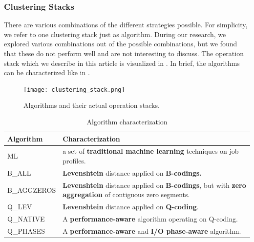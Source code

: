 \documentclass{jhps}
\begin{document}
\subsubsection{Clustering Stacks}
There are various combinations of the different strategies possible.
For simplicity, we refer to one clustering stack just as algorithm.
During our research, we explored various combinations out of the possible combinations, but we found that these do not perform well and are not interesting to discuss.
The operation stack which we describe in this article is visualized in .
In brief, the algorithms can be characterized like in .

\begin{figure}[ht]
  \centering
  \texttt{[image: clustering\_stack.png]}
  \caption{Algorithms and their actual operation stacks.}
  \label{fig:clustering_stacks}
\end{figure}


\begin{table}[ht]
  \begin{tabularx}{\textwidth}{lX}
    Algorithm & Characterization \\
    \midrule
    ML            & a set of \textbf{traditional machine learning} techniques on job profiles.                                                        \\
    B\_ALL      & \textbf{Levenshtein} distance applied on \textbf{B-codings.}                                                                 \\
    B\_AGGZEROS & \textbf{Levenshtein} distance applied on \textbf{B-codings}, but with \textbf{zero aggregation} of contiguous zero segments. \\
    Q\_LEV      & \textbf{Levenshtein} distance applied on \textbf{Q-coding}.                                                             \\
    Q\_NATIVE   & A \textbf{performance-aware} algorithm operating on Q-coding.                                                                                           \\
    Q\_PHASES     & A \textbf{performance-aware} and \textbf{I/O phase-aware} algorithm.                                                              \\
  \end{tabularx}
  \caption{Algorithm characterization}
  \label{tab:alg_character}
\end{table}
\end{document}
